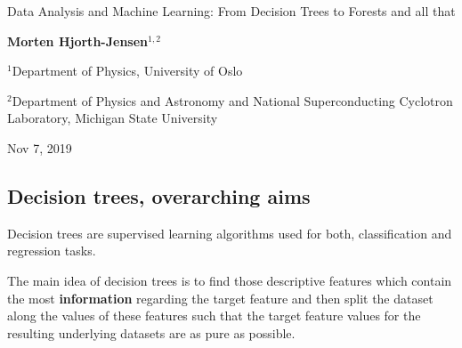 \documentclass[%
oneside,                 %
final,                   %
10pt]{article}
\begin{document}

\newcommand{\exercisesection}[1]{\subsection*{#1}}






\thispagestyle{empty}

\begin{center}
{\LARGE\bf
\begin{spacing}{1.25}
Data Analysis and Machine Learning: From Decision Trees to Forests and all that
\end{spacing}
}
\end{center}


\begin{center}
{\bf Morten Hjorth-Jensen${}^{1, 2}$} \\ [0mm]
\end{center}

\begin{center}
\centerline{{\small ${}^1$Department of Physics, University of Oslo}}
\centerline{{\small ${}^2$Department of Physics and Astronomy and National Superconducting Cyclotron Laboratory, Michigan State University}}
\end{center}
    

\begin{center}
Nov 7, 2019
\end{center}

\vspace{1cm}


\subsection{Decision trees, overarching aims}


Decision trees are supervised learning algorithms used for both,
classification and regression tasks.


The main idea of decision trees
is to find those descriptive features which contain the most
\textbf{information} regarding the target feature and then split the dataset
along the values of these features such that the target feature values
for the resulting underlying datasets are as pure as possible.
\end{document}
